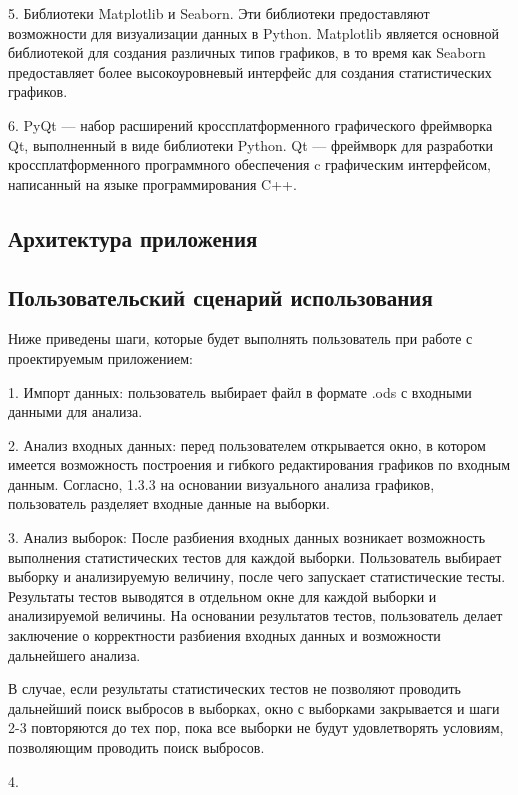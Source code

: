 5. Библиотеки Matplotlib и Seaborn. Эти библиотеки предоставляют
возможности для визуализации данных в Python. Matplotlib является основной
библиотекой для создания различных типов графиков, в то время как Seaborn
предоставляет более высокоуровневый интерфейс для создания
статистических графиков.

6. PyQt --- набор расширений кроссплатформенного графического фреймворка Qt, выполненный в виде библиотеки Python. Qt --- фреймворк для разработки кроссплатформенного программного обеспечения c графическим интерфейсом, написанный на языке программирования C++.

\subsection{Архитектура приложения}

\subsection{Пользовательский сценарий использования}

Ниже приведены шаги, которые будет выполнять пользователь при работе с проектируемым приложением:

1. Импорт данных: пользователь выбирает файл в формате .ods с входными данными для анализа.

2. Анализ входных данных: перед пользователем открывается окно, в котором имеется возможность построения и гибкого редактирования графиков по входным данным. Согласно, 1.3.3 на основании визуального анализа графиков, пользователь разделяет входные данные на выборки.

3. Анализ выборок: После разбиения входных данных возникает возможность выполнения статистических тестов для каждой выборки. Пользователь выбирает выборку и анализируемую величину, после чего запускает статистические тесты. Результаты тестов выводятся в отдельном окне для каждой выборки и анализируемой величины. На основании результатов тестов, пользователь делает заключение о корректности разбиения входных данных и возможности дальнейшего анализа.

В случае, если результаты статистических тестов не позволяют проводить дальнейший поиск выбросов в выборках, окно с выборками закрывается и шаги 2-3 повторяются до тех пор, пока все выборки не будут удовлетворять условиям, позволяющим проводить поиск выбросов.

4. 